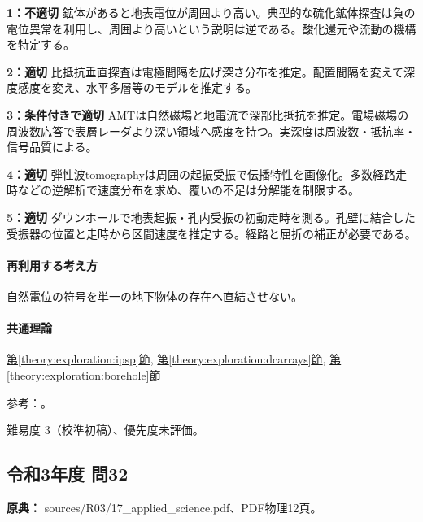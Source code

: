 \noindent\textbf{1：不適切} 鉱体があると地表電位が周囲より高い。典型的な硫化鉱体探査は負の電位異常を利用し、周囲より高いという説明は逆である。酸化還元や流動の機構を特定する。\par

\noindent\textbf{2：適切} 比抵抗垂直探査は電極間隔を広げ深さ分布を推定。配置間隔を変えて深度感度を変え、水平多層等のモデルを推定する。\par

\noindent\textbf{3：条件付きで適切} AMTは自然磁場と地電流で深部比抵抗を推定。電場磁場の周波数応答で表層レーダより深い領域へ感度を持つ。実深度は周波数・抵抗率・信号品質による。\par

\noindent\textbf{4：適切} 弾性波tomographyは周囲の起振受振で伝播特性を画像化。多数経路走時などの逆解析で速度分布を求め、覆いの不足は分解能を制限する。\par

\noindent\textbf{5：適切} ダウンホールで地表起振・孔内受振の初動走時を測る。孔壁に結合した受振器の位置と走時から区間速度を推定する。経路と屈折の補正が必要である。\par

\paragraph{再利用する考え方} 自然電位の符号を単一の地下物体の存在へ直結させない。

\paragraph{共通理論} \hyperref[theory:exploration:ipsp]{第\ref*{theory:exploration:ipsp}節}, \hyperref[theory:exploration:dcarrays]{第\ref*{theory:exploration:dcarrays}節}, \hyperref[theory:exploration:borehole]{第\ref*{theory:exploration:borehole}節}

\par 参考：\cite{epa_sp,epa_resistivity,usgs_mt_metadata,geebec_ps}。

\par 難易度 3（校準初稿）、優先度未評価。

\subsection{令和3年度 問32}
\label{q:r03-reg-applied-32}

\noindent\textbf{原典：} sources/R03/17\_applied\_science.pdf、PDF物理12頁。

